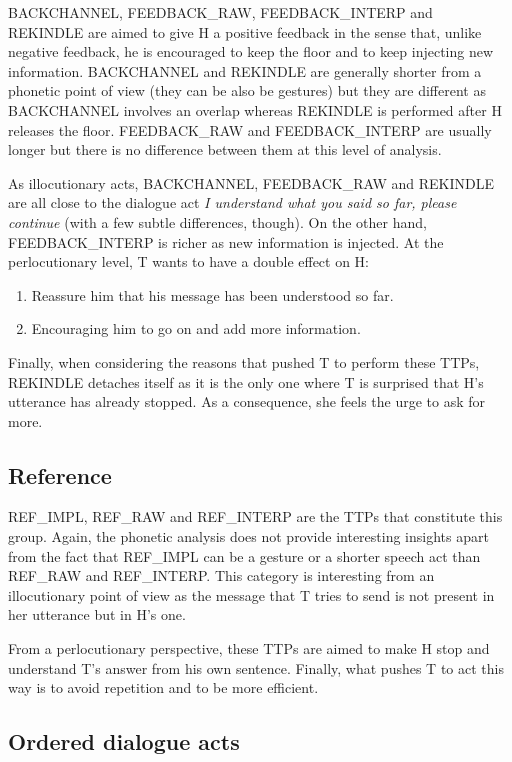 					BACKCHANNEL, FEEDBACK\_RAW, FEEDBACK\_INTERP and REKINDLE are aimed to give H a positive feedback in the sense that, unlike negative feedback, he is encouraged to keep the floor and to keep injecting new information. BACKCHANNEL and REKINDLE are generally shorter from a phonetic point of view (they can be also be gestures) but they are different as BACKCHANNEL involves an overlap whereas REKINDLE is performed after H releases the floor. FEEDBACK\_RAW and FEEDBACK\_INTERP are usually longer but there is no difference between them at this level of analysis.
					
					As illocutionary acts, BACKCHANNEL, FEEDBACK\_RAW and REKINDLE are all close to the dialogue act \textit{I understand what you said so far, please continue} (with a few subtle differences, though). On the other hand, FEEDBACK\_INTERP is richer as new information is injected. At the perlocutionary level, T wants to have a double effect on H:
					\begin{enumerate}
						\item Reassure him that his message has been understood so far.
						\item Encouraging him to go on and add more information.
					\end{enumerate}
					
					Finally, when considering the reasons that pushed T to perform these TTPs, REKINDLE detaches itself as it is the only one where T is surprised that H's utterance has already stopped. As a consequence, she feels the urge to ask for more.

    \subsection{Reference}
		
					REF\_IMPL, REF\_RAW and REF\_INTERP are the TTPs that constitute this group. Again, the phonetic analysis does not provide interesting insights apart from the fact that REF\_IMPL can be a gesture or a shorter speech act than REF\_RAW and REF\_INTERP. This category is interesting from an illocutionary point of view as the message that T tries to send is not present in her utterance but in H's one.
					
					From a perlocutionary perspective, these TTPs are aimed to make H stop and understand T's answer from his own sentence. Finally, what pushes T to act this way is to avoid repetition and to be more efficient.

    \subsection{Ordered dialogue acts}

